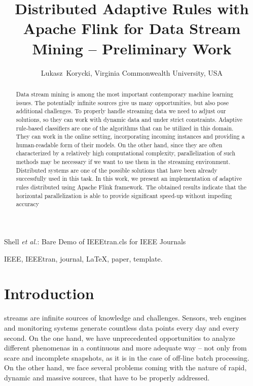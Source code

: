 \documentclass[journal]{IEEEtran}
\begin{document}
\title{Distributed Adaptive Rules with Apache Flink for Data Stream Mining -- Preliminary Work}

\author{Lukasz~Korycki, Virginia Commonwealth University, USA}%

%
{Shell \MakeLowercase{\textit{et al.}}: Bare Demo of IEEEtran.cls for IEEE Journals}

\maketitle

\begin{abstract}
	Data stream mining is among the most important contemporary machine learning issues. The potentially infinite sources give us many opportunities, but also pose additional challenges. To properly handle streaming data we need to adjust our solutions, so they can work with dynamic data and under strict constraints. Adaptive rule-based classifiers are one of the algorithms that can be utilized in this domain. They can work in the online setting, incorporating incoming instances and providing a human-readable form of their models. On the other hand, since they are often characterized by a relatively high computational complexity, parallelization of such methods may be necessary if we want to use them in the streaming environment. Distributed systems are one of the possible solutions that have been already successfully used in this task. In this work, we present an implementation of adaptive rules distributed using Apache Flink framework. The obtained results indicate that the horizontal parallelization is able to provide significant speed-up without impeding accuracy 
\end{abstract}

\begin{IEEEkeywords}
	IEEE, IEEEtran, journal, \LaTeX, paper, template.
\end{IEEEkeywords}

\IEEEpeerreviewmaketitle

\section{Introduction}

 streams are infinite sources of knowledge and challenges. Sensors, web engines and monitoring systems generate countless data points every day and every second. On the one hand, we have unprecedented opportunities to analyze different phenomenas in a continuous and more adequate way -- not only from scare and incomplete snapshots, as it is in the case of off-line batch processing. On the other hand, we face several problems coming with the nature of rapid, dynamic and massive sources, that have to be properly addressed. 
\end{document}
